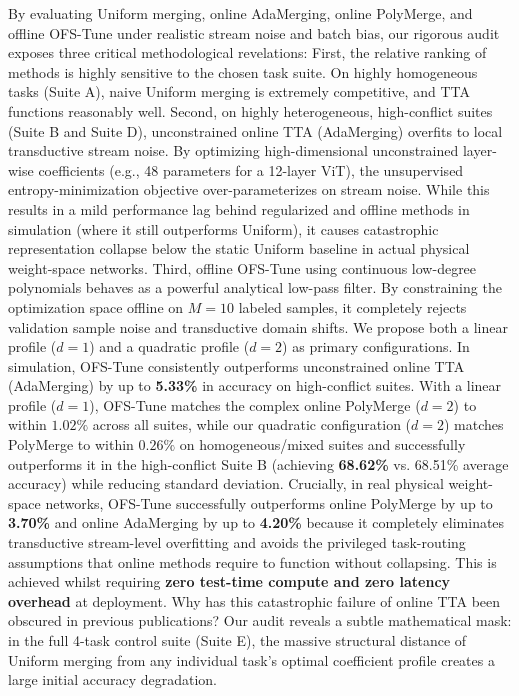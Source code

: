 By evaluating Uniform merging, online AdaMerging, online PolyMerge, and offline OFS-Tune under realistic stream noise and batch bias, our rigorous audit exposes three critical methodological revelations:
First, the relative ranking of methods is highly sensitive to the chosen task suite.
On highly homogeneous tasks (Suite A), naive Uniform merging is extremely competitive, and TTA functions reasonably well.
Second, on highly heterogeneous, high-conflict suites (Suite B and Suite D), unconstrained online TTA (AdaMerging) overfits to local transductive stream noise.
By optimizing high-dimensional unconstrained layer-wise coefficients (e.g., 48 parameters for a 12-layer ViT), the unsupervised entropy-minimization objective over-parameterizes on stream noise.
While this results in a mild performance lag behind regularized and offline methods in simulation (where it still outperforms Uniform), it causes catastrophic representation collapse below the static Uniform baseline in actual physical weight-space networks.
Third, offline OFS-Tune using continuous low-degree polynomials behaves as a powerful analytical low-pass filter.
By constraining the optimization space offline on $M=10$ labeled samples, it completely rejects validation sample noise and transductive domain shifts.
We propose both a linear profile ($d=1$) and a quadratic profile ($d=2$) as primary configurations.
In simulation, OFS-Tune consistently outperforms unconstrained online TTA (AdaMerging) by up to \textbf{5.33\%} in accuracy on high-conflict suites.
With a linear profile ($d=1$), OFS-Tune matches the complex online PolyMerge ($d=2$) to within $1.02\%$ across all suites, while our quadratic configuration ($d=2$) matches PolyMerge to within $0.26\%$ on homogeneous/mixed suites and successfully outperforms it in the high-conflict Suite B (achieving \textbf{68.62\%} vs.
68.51\% average accuracy) while reducing standard deviation.
Crucially, in real physical weight-space networks, OFS-Tune successfully outperforms online PolyMerge by up to \textbf{3.70\%} and online AdaMerging by up to \textbf{4.20\%} because it completely eliminates transductive stream-level overfitting and avoids the privileged task-routing assumptions that online methods require to function without collapsing.
This is achieved whilst requiring \textbf{zero test-time compute and zero latency overhead} at deployment.
Why has this catastrophic failure of online TTA been obscured in previous publications?
Our audit reveals a subtle mathematical mask: in the full 4-task control suite (Suite E), the massive structural distance of Uniform merging from any individual task's optimal coefficient profile creates a large initial accuracy degradation.
